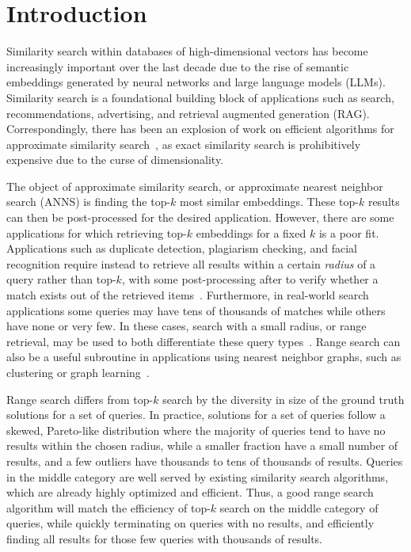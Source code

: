 \section{Introduction}\label{sec:intro}

Similarity search within databases of high-dimensional vectors has become increasingly important over the last decade due to the rise of semantic embeddings generated by neural networks and large language models (LLMs). Similarity search is a foundational building block of applications such as search, recommendations, advertising, and retrieval augmented generation (RAG). Correspondingly, there has been an explosion of work on efficient algorithms for approximate similarity search~\cite{jegou2010product,malkov2018efficient,subramanya2019diskann,fu2019nsg}, as exact similarity search is prohibitively expensive due to the curse of dimensionality.

The object of approximate similarity search, or approximate nearest neighbor search (ANNS) is finding the top-$k$ most similar embeddings. These top-$k$ results can then be post-processed for the desired application. However, there are some applications for which retrieving top-$k$ embeddings for a fixed $k$ is a poor fit. Applications such as duplicate detection, plagiarism checking, and facial recognition require instead to retrieve all results within a certain \textit{radius} of a query rather than top-$k$, with some post-processing after to verify whether a match exists out of the retrieved items~\cite{douze2021image,schroff2015facenet,simsearchnet}. Furthermore, in real-world search applications some queries may have tens of thousands of matches while others have none or very few. In these cases, search with a small radius, or range retrieval, may be used to both differentiate these query types~\cite{szilvasy2024vector}. Range search can also be a useful subroutine in applications using nearest neighbor graphs, such as clustering or graph learning~\cite{Grale20,li2020density}.

Range search differs from top-$k$ search by the diversity in size of the ground truth solutions for a set of queries. In practice, solutions for a set of queries follow a skewed, Pareto-like distribution where the majority of queries tend to have no results within the chosen radius, while a smaller fraction have a small number of results, and a few outliers have thousands to tens of thousands of results. Queries in the middle category are well served by existing similarity search algorithms, which are already highly optimized and efficient. Thus, a good range search algorithm will match the efficiency of top-$k$ search on the middle category of queries, while quickly terminating on queries with no results, and efficiently finding all results for those few queries with thousands of results.

